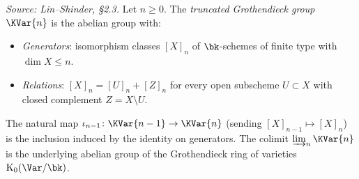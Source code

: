 \begin{definition}
  \label{def:truncated-grothendieck}
  \textit{Source: Lin--Shinder, §2.3.}
  Let \(n \geq 0\).  The \emph{truncated Grothendieck group} \(\KVar{n}\) is the
  abelian group with:
  \begin{itemize}
    \item \emph{Generators}: isomorphism classes \([X]_n\) of \(\bk\)-schemes of
      finite type with \(\dim X \leq n\).
    \item \emph{Relations}: \([X]_n = [U]_n + [Z]_n\) for every open subscheme
      \(U \subset X\) with closed complement \(Z = X \setminus U\).
  \end{itemize}
  The natural map \(\iota_{n-1} \colon \KVar{n-1} \to \KVar{n}\) (sending
  \([X]_{n-1} \mapsto [X]_n\)) is the inclusion induced by the identity on
  generators.  The colimit \(\varinjlim_n \KVar{n}\) is the underlying abelian
  group of the Grothendieck ring of varieties \(\mathrm{K}_0(\Var/\bk)\).
\end{definition}

